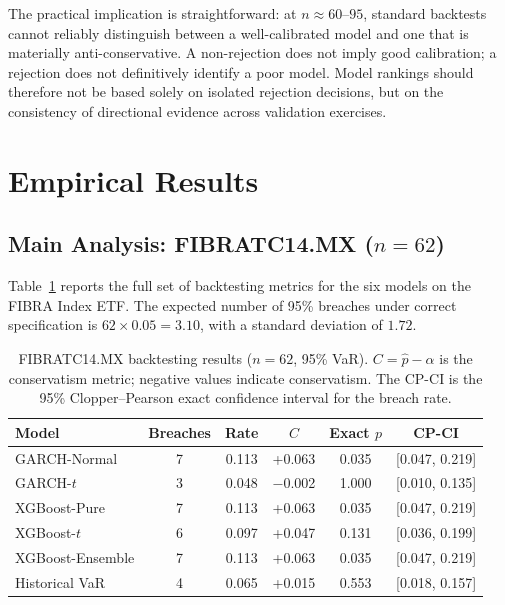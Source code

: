 \documentclass[12pt,a4paper]{article}
\begin{document}
The practical implication is straightforward: at $n \approx 60$--$95$, standard backtests cannot reliably distinguish between a well-calibrated model and one that is materially anti-conservative. A non-rejection does not imply good calibration; a rejection does not definitively identify a poor model. Model rankings should therefore not be based solely on isolated rejection decisions, but on the consistency of directional evidence across validation exercises.

\section{Empirical Results}

\subsection{Main Analysis: FIBRATC14.MX ($n = 62$)}

Table~\ref{tab:fibraresults} reports the full set of backtesting metrics for the six models on the FIBRA Index ETF. The expected number of 95\% breaches under correct specification is $62 \times 0.05 = 3.10$, with a standard deviation of $1.72$.

\begin{table}[H]
\centering
\caption{FIBRATC14.MX backtesting results ($n = 62$, 95\% VaR). $C = \hat{p} - \alpha$ is the conservatism metric; negative values indicate conservatism. The CP-CI is the 95\% Clopper--Pearson exact confidence interval for the breach rate.}
\label{tab:fibraresults}
\begin{tabular}{lccccc}
\toprule
Model & Breaches & Rate & $C$ & Exact $p$ & CP-CI \\
\midrule
GARCH-Normal     & 7 & 0.113 & +0.063 & 0.035 & [0.047, 0.219] \\
GARCH-$t$        & 3 & 0.048 & $-$0.002 & 1.000 & [0.010, 0.135] \\
XGBoost-Pure     & 7 & 0.113 & +0.063 & 0.035 & [0.047, 0.219] \\
XGBoost-$t$      & 6 & 0.097 & +0.047 & 0.131 & [0.036, 0.199] \\
XGBoost-Ensemble & 7 & 0.113 & +0.063 & 0.035 & [0.047, 0.219] \\
Historical VaR   & 4 & 0.065 & +0.015 & 0.553 & [0.018, 0.157] \\
\bottomrule
\end{tabular}
\end{table}
\end{document}
